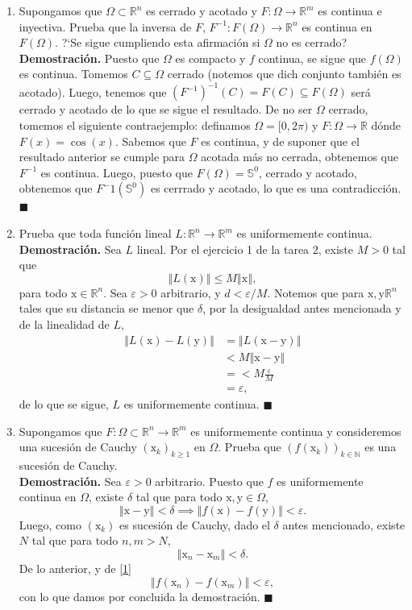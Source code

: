 \documentclass[12pt]{article}
\newcommand{\norm}[1]{\left\Vert#1\right\Vert}
\newcommand{\N}{\mathbb N}
\newcommand{\R}{\mathbb R}
\newcommand{\x}{\mathrm x}
\newcommand{\y}{\mathrm y}
\newcommand{\To}{\longrightarrow}
\begin{document}
\begin{enumerate}
\item Supongamos que $\Omega\subset \R^n$ es cerrado y acotado y 
$F:\Omega\To \R^m$ es continua e inyectiva. Prueba que la inversa de $F$, $F^{-1}:F(\Omega)\To \R^n$ es continua en $F(\Omega)$. ?`Se sigue cumpliendo esta afirmación si $\Omega$ no es cerrado? \\
\textbf{Demostración.} Puesto que $\Omega$ es compacto y $f$ continua, se sigue que $f(\Omega)$ es continua. Tomemos $C\subseteq \Omega$ cerrado (notemos que dich conjunto también es acotado). Luego, tenemos que
$\left(F^{-1}\right)^{-1}(C) =  F(C)\subseteq F(\Omega)$ será cerrado y acotado de lo que se sigue el resultado. De no ser $\Omega$ cerrado, tomemos el siguiente contraejemplo:
definamos $\Omega=[0,2\pi)$ y $F:\Omega\longrightarrow \R$ dónde $F(x)=\cos(x)$. Sabemos que $F$ es continua, y de suponer que el resultado anterior se cumple para $\Omega$ acotada más no cerrada, obtenemos que $F^{-1}$ es continua.
Luego, puesto que $F(\Omega)=\mathbb{S}^0$, cerrado y acotado, obtenemos que $F^-1(\mathbb{S}^0)$ es cerrrado y acotado, lo que es una contradicción. 
\hfill $\blacksquare$

\newpage
\item Prueba que toda función lineal $L:\R^n\To \R^m$ es uniformemente continua. \\
\textbf{Demostración.} Sea $L$ lineal. Por el ejercicio 1 de la tarea 2, existe $M>0$ tal que
\[
\norm{L(\x)} \leq M\norm{\x},
\]
para todo $\x\in\R^n$. Sea $\varepsilon > 0$ arbitrario, y $d<\varepsilon/M$. Notemos que para $\x,\y \R^n$ tales que su distancia se menor que $\delta$, por la desigualdad antes mencionada y de la linealidad de $L$,
\begin{align*}
    \norm{L(\x)-L(\y)} &=  \norm{L(\x-\y)}\\
    & < M\norm{\x-\y} \\
    &= <M\frac{\varepsilon}{M} \\
    &=\varepsilon,
\end{align*}
de lo que se sigue, $L$ es uniformemente continua. \hfill $\blacksquare$

\item Supongamos que $F:\Omega\subset \R^n\To \R^m$ es uniformemente continua y consideremos una sucesi\'on de Cauchy $(\x_k)_{k\geq 1}$ en $\Omega$. Prueba que $(f(\x_k))_{k\in \N}$ es una sucesión de Cauchy. \\
\textbf{Demostración.}
Sea $\varepsilon > 0$ arbitrario. Puesto que $f$ es uniformemente continua en $\Omega$, existe $\delta$ tal que para todo $\x,\y \in \Omega$,
\[
\norm{\x-\y} < \delta \implies \norm{f(\x)-f(\y)}<\varepsilon. \tag{1} \label{1}
\]
Luego, como $(\x_k)$ es sucesión de Cauchy, dado el $\delta$ antes mencionado, existe $N$ tal que para todo $n,m > N$,
\[
\norm{\x_n-\x_m}<\delta.
\]
De lo anterior, y de \eqref{1}
\[
\norm{f(\x_n)-f(\x_m)}<\varepsilon,
\]
con lo que damos por concluida la demostración. \hfill $\blacksquare$
\end{enumerate}
\end{document}
